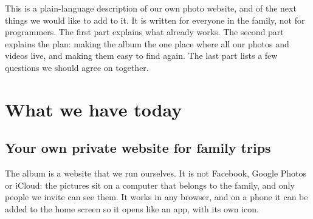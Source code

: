 \documentclass[11pt,a4paper]{article}
\begin{document}
\begin{center}
\end{center}

\vspace{4pt}
This is a plain-language description of our own photo website, and of the next things we would like to add to it. It is written for everyone in the family, not for programmers. The first part explains what already works. The second part explains the plan: making the album the one place where all our photos and videos live, and making them easy to find again. The last part lists a few questions we should agree on together.

\tableofcontents

\section{What we have today}

\subsection{Your own private website for family trips}

The album is a website that we run ourselves. It is not Facebook, Google Photos or iCloud: the pictures sit on a computer that belongs to the family, and only people we invite can see them. It works in any browser, and on a phone it can be added to the home screen so it opens like an app, with its own icon.
\end{document}
